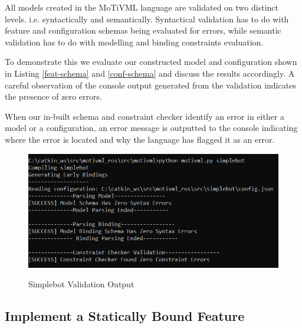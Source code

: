 \documentclass{article}
\begin{document}
All models created in the MoTiVML language are validated on two distinct levels. i.e. syntactically and semantically. Syntactical validation has to do with feature and configuration schemas being evaluated for errors, while semantic validation has to do with modelling and binding constraints evaluation.

To demonstrate this we evaluate our constructed model and configuration shown in Listing \ref{feat-schema} and \ref{conf-schema} and discuss the results accordingly. A careful observation of  the console output generated from the validation indicates the presence of zero errors. 

When our in-built schema and constraint checker identify an error in either a model or a configuration, an error message is outputted to the console indicating where the error is located and why the language has flagged it as an error.

\begin{figure}[H]
	\caption{Simplebot Validation Output}
	\centering
	\includegraphics[width=\columnwidth]{images/validate.png}
	\label{validation}
\end{figure}


\subsection{Implement a Statically Bound Feature}
\end{document}
